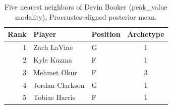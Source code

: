 \begin{table}[htbp]
  \centering\small
  \begin{tabular}{rllc}
    \toprule
    Rank & Player & Position & Archetype \\
    \midrule
    1 & Zach LaVine & G & 1 \\
    2 & Kyle Kuzma & F & 1 \\
    3 & Mehmet Okur & F & 3 \\
    4 & Jordan Clarkson & G & 1 \\
    5 & Tobias Harris & F & 1 \\
    \bottomrule
  \end{tabular}
  \caption{Five nearest neighbors of Devin Booker (peak_value modality), Procrustes-aligned posterior mean.}
  \label{tab:Devin_Booker_neighbors_peak_value}
\end{table}

